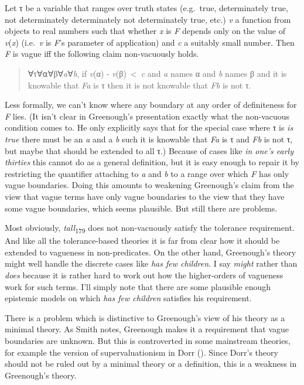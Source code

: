 \documentclass[
  11pt,
  letterpaper,
  DIV=11,
  numbers=noendperiod,
  twoside]{scrartcl}
\begin{document}
Let τ be a variable that ranges over truth states (e.g.~true,
determinately true, not determinately determinately not determinately
true, etc.) \emph{v} a function from objects to real numbers such that
whether \emph{x} is \emph{F} depends only on the value of
\emph{v}(\emph{x}) (i.e.~\emph{v} is \emph{F}'s parameter of
application) and \emph{c} a suitably small number. Then \emph{F} is
vague iff the following claim non-vacuously holds.

\begin{quote}
∀τ∀⍺∀β∀\emph{a}∀\emph{b}, if \emph{v}(α) -
\emph{v}(β)~\textless~\emph{c} and \emph{a} names α and \emph{b} names β
and it is knowable that \emph{Fa} is τ then it is not knowable that
\emph{Fb} is not τ.
\end{quote}

Less formally, we can't know where any boundary at any order of
definiteness for \emph{F} lies. (It isn't clear in Greenough's
presentation exactly what the non-vacuous condition comes to. He only
explicitly says that for the special case where τ is \emph{is true}
there must be an \emph{a} and a \emph{b} such it is knowable that
\emph{Fa} is τ and \emph{Fb} is not τ, but maybe that should be extended
to all τ.) Because of cases like \emph{in one's early thirties} this
cannot do as a general definition, but it is easy enough to repair it by
restricting the quantifier attaching to \emph{a} and \emph{b} to a range
over which \emph{F} has only vague boundaries. Doing this amounts to
weakening Greenough's claim from the view that vague terms have only
vague boundaries to the view that they have some vague boundaries, which
seems plausible. But still there are problems.

Most obviously, \emph{tall}\textsubscript{179} does not non-vacuously
satisfy the tolerance requirement. And like all the tolerance-based
theories it is far from clear how it should be extended to vagueness in
non-predicates. On the other hand, Greenough's theory might well handle
the discrete cases like \emph{has few children}. I say \emph{might}
rather than \emph{does} because it is rather hard to work out how the
higher-orders of vagueness work for such terms. I'll simply note that
there are some plausible enough epistemic models on which \emph{has few
children} satisfies his requirement.

There is a problem which is distinctive to Greenough's view of his
theory as a minimal theory. As Smith notes, Greenough makes it a
requirement that vague boundaries are unknown. But this is controverted
in some mainstream theories, for example the version of
supervaluationism in Dorr (). Since Dorr's
theory should not be ruled out by a minimal theory or a definition, this
is a weakness in Greenough's theory.
\end{document}
